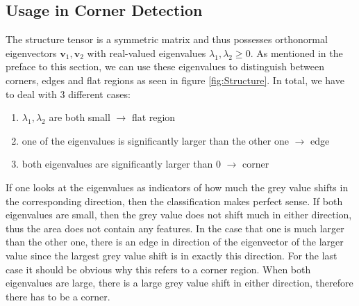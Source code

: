 \subsection{Usage in Corner Detection}\label{sub:Corner}
The structure tensor is a symmetric matrix and thus possesses orthonormal eigenvectors $\boldsymbol v_1,
\boldsymbol v_2$ with real-valued eigenvalues $\lambda_1, \lambda_2 \geq 0$. \cite{ipcv19-13} As
mentioned in the preface to this section, we can use these eigenvalues to distinguish between
corners, edges and flat regions as seen in figure \ref{fig:Structure}.
In total, we have to deal with 3 different cases:
\begin{enumerate}
    \item $\lambda_1, \lambda_2$ are both small $\rightarrow$ flat region
    \item one of the eigenvalues is significantly larger than the other one $\rightarrow$ edge
    \item both eigenvalues are significantly larger than 0 $\rightarrow$ corner
\end{enumerate}
If one looks at the eigenvalues as indicators of how much the grey value shifts in the
corresponding
direction, then the classification makes perfect sense. If both eigenvalues are small, then the
grey value does not shift much in either direction, thus the area does not contain any features.
In the case that one is much larger than the other one, there is an edge in direction of the
eigenvector of the larger value since the largest grey value shift is in exactly this direction.
For the last case it should be obvious why this refers to a corner region. When both eigenvalues
are large, there is a large grey value shift in either direction, therefore there has to be a
corner.\\
